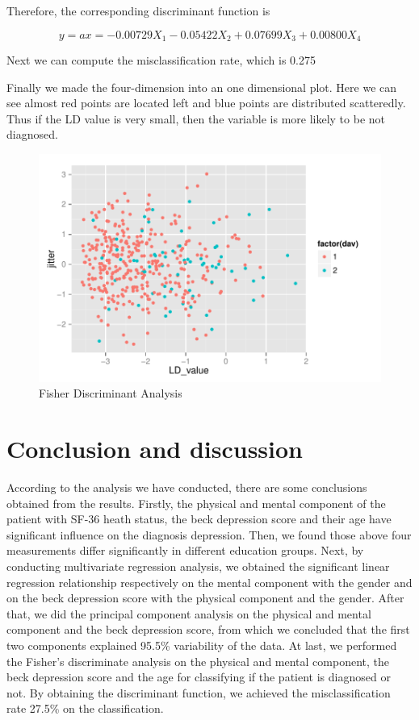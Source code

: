 \documentclass{article}
\begin{document}
      Therefore, the corresponding discriminant function is

      $$y = ax = -0.00729X_1 -0.05422X_2 + 0.07699X_3 + 0.00800X_4$$

      Next we can compute the misclassification rate, which is 0.275

      Finally we made the four-dimension into an one dimensional plot. Here we can see almost red points are located left and blue points are distributed scatteredly. Thus if the LD value is very small, then the variable is more likely to be not diagnosed.

      \begin{figure}[htb!]
        \centering
        \includegraphics[width=0.8\linewidth]{image3.pdf}
        \caption{Fisher Discriminant Analysis}
      \end{figure}
  \section{Conclusion and discussion}
    According to the analysis we have conducted, there are some conclusions obtained from the results. Firstly, the physical and mental component of the patient with SF-36 heath status, the beck depression score and their age have significant influence on the diagnosis depression. Then, we found those above four measurements differ significantly in different education groups. Next, by conducting multivariate regression analysis, we obtained the significant linear regression relationship respectively on the mental component with the gender and on the beck depression score with the physical component and the gender. After that, we did the principal component analysis on the physical and mental component and the beck depression score, from which we concluded that the first two components explained 95.5\% variability of the data. At last, we performed the Fisher's discriminate analysis on the physical and mental component, the beck depression score and the age for classifying if the patient is diagnosed or not. By obtaining the discriminant function, we achieved the misclassification rate 27.5\% on the classification.
\end{document}
